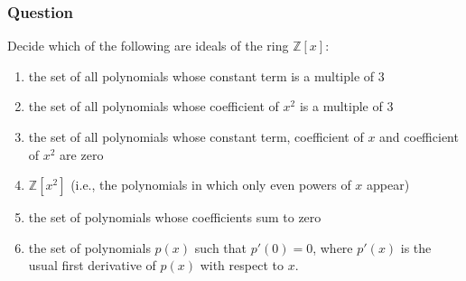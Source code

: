 \documentclass[12pt]{article}
\begin{document}
\subsubsection{Question}
Decide which of the following are ideals of the ring $\mathbb{Z} [x]$:
\begin{enumerate}
\item the set of all polynomials whose constant term is a multiple of $3$
\item the set of all polynomials whose coefficient of $x^2$ is a multiple of $3$
\item the set of all polynomials whose constant term, coefficient of $x$ and coefficient of $x^2$ are zero
\item $\mathbb{Z}[x^2]$ (i.e., the polynomials in which only even powers of $x$ appear)
\item the set of polynomials whose coefficients sum to zero
\item the set of polynomials $p(x)$ such that $p'(0)=0$, where $p'(x)$ is the usual first derivative of $p(x)$ with respect to $x$.
\end{enumerate}
\end{document}
